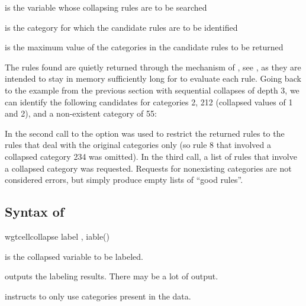 
\hangpara
{} is the variable whose collapsing rules are to be searched

\hangpara
{} is the category for which the candidate rules are to be identified

\hangpara
{} is the maximum value of the categories in the candidate rules to be returned

The rules found are quietly returned through the mechanism of ,
see , as they are intended to stay in memory sufficiently long for
 to evaluate each rule. Going back to the example
from the previous section
with sequential collapses of depth 3, we can identify the following candidates
for categories 2, 212 (collapsed values of 1 and 2), and a non-existent category of 55:

\begin{stlog}
\nullskip
\end{stlog}

In the second call to
the option  was used to restrict the returned rules to the rules
that deal with the original categories only (so rule 8 that involved a collapsed category 234
was omitted). In the third call, a list of rules
that involve a collapsed category  was requested. Requests
for nonexisting categories are not considered errors, but simply produce empty lists
of ``good rules''.

\subsection{Syntax of }

\begin{stsyntax}
wgtcellcollapse label
,
iable(\varname)
\end{stsyntax}

\hangpara
{} is the collapsed variable to be labeled.

\hangpara
{} outputs the labeling results. There may be a lot of output.

\hangpara
{} instructs  to only use categories present in the data.

